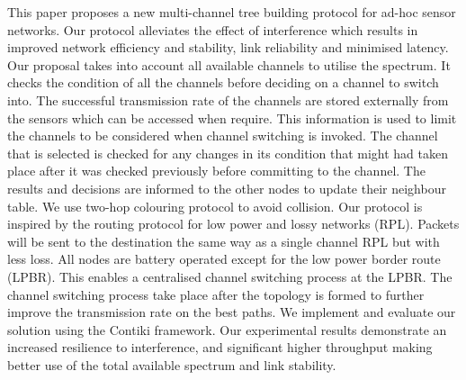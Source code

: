 This paper proposes a new multi-channel tree building protocol for ad-hoc sensor networks. Our protocol alleviates the effect of interference which results in improved network efficiency and stability, link reliability and minimised latency. 
        Our proposal takes into account all available channels to utilise the spectrum. It checks the condition of all the channels before deciding on a channel to switch into. The successful transmission rate of the channels are stored externally from the sensors which can be accessed when require. This information is used to limit the channels to be considered when channel switching is invoked. The channel that is selected is checked for any changes in its condition that might had taken place after it was checked previously before committing to the channel. The results and decisions are informed to the other nodes to update their neighbour table. We use two-hop colouring protocol to avoid collision. 
	Our protocol is inspired by the routing protocol for low power and lossy networks (RPL). Packets will be sent to the destination the same way as a single channel RPL but with less loss. 
	All nodes are battery operated except for the low power border route (LPBR). This enables a centralised channel switching process at the LPBR. The channel switching process take place after the topology is formed to further improve the transmission rate on the best paths.
	We implement and evaluate our solution using the Contiki framework. Our experimental results demonstrate an increased resilience to interference, and significant higher throughput making better use of the total available spectrum and link stability. 
